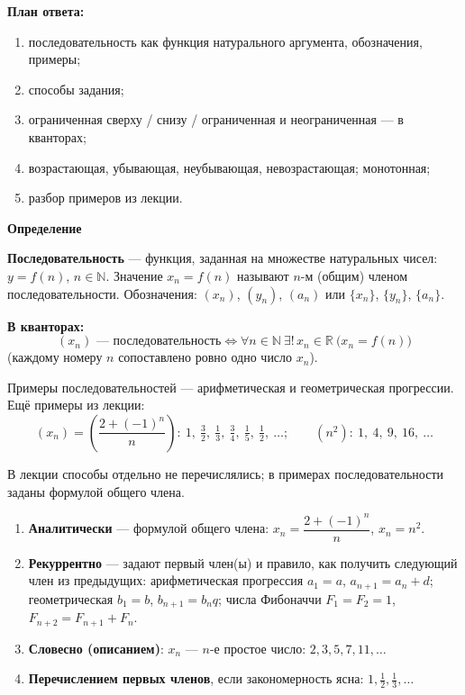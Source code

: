 \documentclass[a4paper,11pt]{article}
\newcommand{\N}{\mathbb{N}}
\newcommand{\R}{\mathbb{R}}
\newcommand{\kv}{\par\noindent\textbf{\textcolor{oprc!85!black}{В кванторах:}}}
\newcommand{\podr}[1]{\par\needspace{8\baselineskip}\medskip
  {\large\bfseries\textcolor{oprc!80!black}{#1}}\par\nopagebreak\smallskip}
\newcommand{\plan}[1]{\begin{planbox}\textbf{План ответа:}
  \begin{enumerate}[nosep,leftmargin=*,label=\arabic*)]#1\end{enumerate}\end{planbox}}
\begin{document}
\plan{\item последовательность как функция натурального аргумента, обозначения, примеры;
\item способы задания;
\item ограниченная сверху / снизу / ограниченная и неограниченная --- в кванторах;
\item возрастающая, убывающая, неубывающая, невозрастающая; монотонная;
\item разбор примеров из лекции.}

\podr{Определение}

\begin{opr}[последовательность]
\textbf{Последовательность} --- функция, заданная на множестве натуральных чисел: $y = f(n)$, $n \in \N$.
Значение $x_n = f(n)$ называют $n$-м (общим) членом последовательности.
Обозначения: $(x_n)$, $(y_n)$, $(a_n)$ или $\{x_n\}$, $\{y_n\}$, $\{a_n\}$.
\kv
\[
  (x_n) \text{ --- последовательность} \Leftrightarrow
  \forall n \in \N\ \exists!\, x_n \in \R\ \bigl(x_n = f(n)\bigr)
\]
(каждому номеру $n$ сопоставлено ровно одно число $x_n$).
\end{opr}

Примеры последовательностей --- арифметическая и геометрическая прогрессии. Ещё примеры из лекции:
\[
  (x_n) = \left( \frac{2 + (-1)^n}{n} \right):\ 1,\ \tfrac32,\ \tfrac13,\ \tfrac34,\ \tfrac15,\ \tfrac12,\ \dots;
  \qquad
  (n^2):\ 1,\ 4,\ 9,\ 16,\ \dots
\]

\begin{dop}
В лекции способы отдельно не перечислялись; в примерах последовательности заданы формулой общего члена.
\begin{enumerate}
  \item \textbf{Аналитически} --- формулой общего члена: $x_n = \dfrac{2 + (-1)^n}{n}$, $x_n = n^2$.
  \item \textbf{Рекуррентно} --- задают первый член(ы) и правило, как получить следующий член из предыдущих:
    арифметическая прогрессия $a_1 = a$, $a_{n+1} = a_n + d$; геометрическая $b_1 = b$, $b_{n+1} = b_n q$;
    числа Фибоначчи $F_1 = F_2 = 1$, $F_{n+2} = F_{n+1} + F_n$.
  \item \textbf{Словесно (описанием)}: $x_n$ --- $n$-е простое число: $2, 3, 5, 7, 11, \dots$
  \item \textbf{Перечислением первых членов}, если закономерность ясна: $1, \frac12, \frac13, \dots$
\end{enumerate}
\end{dop}
\end{document}
